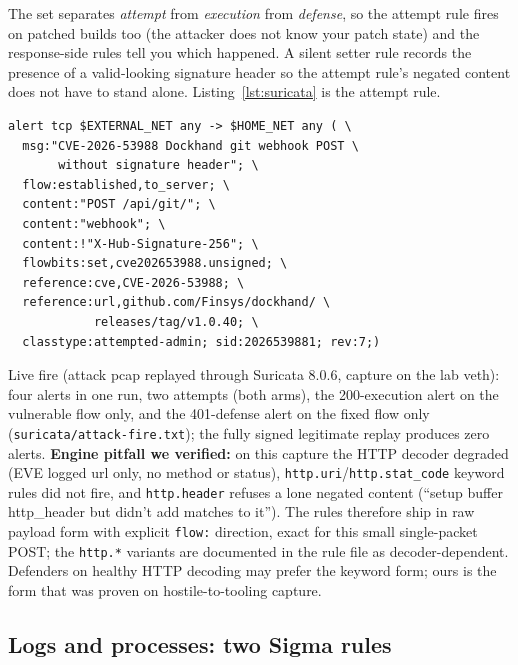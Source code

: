 \documentclass[journal]{IEEEtran}
\begin{document}
The set separates \emph{attempt} from \emph{execution} from \emph{defense}, so
the attempt rule fires on patched builds too (the attacker does not know your
patch state) and the response-side rules tell you which happened. A silent
setter rule records the presence of a valid-looking signature header so the
attempt rule's negated content does not have to stand alone. Listing~\ref{lst:suricata}
is the attempt rule.

\begin{minipage}{\dimexpr\columnwidth-10pt}
\begin{lstlisting}[style=shell,label={lst:suricata},
caption={Attempt signature (sid 2026539881 rev 7, abridged message): raw
payload form, see the decoder note below}]
alert tcp $EXTERNAL_NET any -> $HOME_NET any ( \
  msg:"CVE-2026-53988 Dockhand git webhook POST \
       without signature header"; \
  flow:established,to_server; \
  content:"POST /api/git/"; \
  content:"webhook"; \
  content:!"X-Hub-Signature-256"; \
  flowbits:set,cve202653988.unsigned; \
  reference:cve,CVE-2026-53988; \
  reference:url,github.com/Finsys/dockhand/ \
            releases/tag/v1.0.40; \
  classtype:attempted-admin; sid:2026539881; rev:7;)
\end{lstlisting}
\end{minipage}

Live fire (attack pcap replayed through Suricata 8.0.6, capture on the lab
veth): four alerts in one run, two attempts (both arms), the 200-execution
alert on the vulnerable flow only, and the 401-defense alert on the fixed flow
only (\texttt{suricata/attack-fire.txt}); the fully signed legitimate replay
produces zero alerts. \textbf{Engine pitfall we verified:} on this capture the
HTTP decoder degraded (EVE logged url only, no method or status),
\texttt{http.uri}/\texttt{http.stat\_code} keyword rules did not fire, and
\texttt{http.header} refuses a lone negated content (``setup buffer
http\_header but didn't add matches to it''). The rules therefore ship in raw
payload form with explicit \texttt{flow:} direction, exact for this small
single-packet POST; the \texttt{http.*} variants are documented in the rule
file as decoder-dependent. Defenders on healthy HTTP decoding may prefer the
keyword form; ours is the form that was proven on hostile-to-tooling capture.

\subsection{Logs and processes: two Sigma rules}
\end{document}
